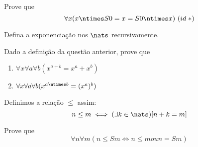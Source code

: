 \begin{exercise}
    Prove que
    $$
    \forall x (x \ntimes S0 = x = S0 \ntimes x)\ (id\;*)
    $$
\end{exercise}

\begin{exercise}
    Defina a exponenciação nos $\nats$ recursivamente.
\end{exercise}

\begin{exercise}
    Dado a definição da questão anterior, prove que

    \begin{enumerate}
        \item $\forall x \forall a \forall b (x^{a + b} = x^a + x^b)$
        \item $\forall x \forall a \forall b (x^{a \ntimes b} = (x^a)^b)$
    \end{enumerate}
\end{exercise}

\begin{definition}
    Definimos a relação $\leq$ assim:
    $$
    n \leq m \iff (\exists k \in \nats)[n + k = m]
    $$
\end{definition}

\begin{exercise}
    Prove que
    $$
    \forall n \forall m (n \leq Sm \iff n \leq m ou n = Sm)
    $$
\end{exercise}
